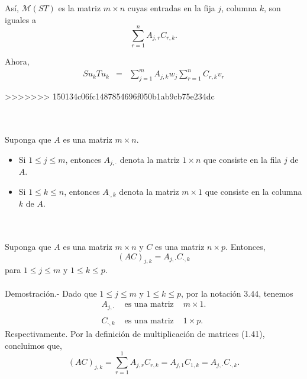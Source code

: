 \begin{myteo}
	Así, $\mathcal{M}(ST)$ es la matriz $m\times n$ cuyas entradas en la fija $j$,  columna $k$, son iguales a
	$$\sum_{r=1}^n A_{j,r}C_{r,k}.$$

	Ahora, 
	$$
	\begin{array}{rcl}
	    S u_k  T u_k &=& \displaystyle\sum_{j=1}^{m} A_{j,k}w_j \sum_{r=1}^{n} C_{r,k}v_r\\\\
	\end{array}
	$$
>>>>>>> 150134c06fc1487854696f050b1ab9cb75e234dc
\end{myteo}

\begin{mynotacion}\,\\\\
    Suponga que $A$ es una matriz $m\times n$.
    \begin{itemize}
	\item Si $1\leq j\leq m$, entonces $A_{j,\cdot}$ denota la matriz $1\times n$ que consiste en la fila $j$ de $A$.
	\item Si $1\leq k\leq n$, entonces $A_{\cdot,k}$ denota la matriz $m\times 1$ que consiste en la columna $k$ de $A$.
    \end{itemize}
\end{mynotacion}

\setcounter{myteo}{46}
\begin{myteo}\,\\\\
    Suponga que $A$ es una matriz $m\times n$ y $C$ es una matriz $n\times p$. Entonces, 
    $$(AC)_{j,k}=A_{j,\cdot}C_{\cdot,k}$$
    para $1\leq j\leq m$ y $1\leq k\leq p$.\\\\
	Demostración.-\; Dado que $1\leq j\leq m$ y $1\leq k\leq p$, por la notación $3.44$, tenemos
	$$
	\begin{array}{ccc}
	    A_{j,\cdot} & \mbox{ es una matriz } & m\times 1.\\\\
	    C_{\cdot,k} & \mbox{ es una matriz } & 1\times p.
	\end{array}
	$$
	Respectivamente. Por la definición de multiplicación de matrices (1.41), concluimos que,
	$$(AC)_{j,k}=\sum_{r=1}^1 A_{j,r}C_{r,k}=A_{j,1}C_{1,k}=A_{j,\cdot}C_{\cdot,k}.$$
\end{myteo}
\vspace{.5cm}

